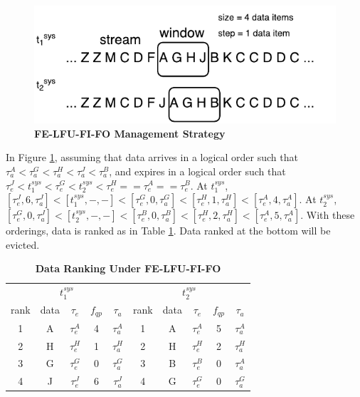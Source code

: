 \begin{figure}[!htbp]
	\centering
    \includegraphics[width=5in]{img/3-sifelfufifo.pdf}
    \caption{\textbf{FE-LFU-FI-FO Management Strategy}}
    \label{fig:3-sifelfufifo}
\end{figure}

In Figure \ref{fig:3-sifelfufifo}, assuming that data arrives in a logical order such that $\tau^{A}_{a} < \tau^{G}_{a} < \tau^{H}_{a} < \tau^{J}_{a} < \tau^{B}_{a}$, and expires in a logical order such that  $\tau^{J}_{e} < t^{sys}_{1} < \tau^{G}_{e} < t^{sys}_{2} < \tau^{H}_{e} == \tau^{A}_{e} == \tau^{B}_{e}$.
At $t^{sys}_{1}$, $[\tau^{J}_{e}, 6, \tau^{J}_{a}] < [t^{sys}_{1}, -, -] < [\tau^{G}_{e}, 0, \tau^{G}_{a}] < [\tau^{H}_{e}, 1, \tau^{H}_{a}] < [\tau^{A}_{e}, 4, \tau^{A}_{a}]$. 
At $t^{sys}_{2}$, $[\tau^{G}_{e}, 0, \tau^{J}_{a}] < [t^{sys}_{2}, -, -] < [\tau^{B}_{e}, 0, \tau^{B}_{a}] < [\tau^{H}_{e}, 2, \tau^{H}_{a}] < [\tau^{A}_{e}, 5, \tau^{A}_{a}]$. 
With these orderings, data is ranked as in Table \ref{tab:felfufifo}. 
Data ranked at the bottom will be evicted. 

\begin{table}[!htbp]
\centering
\caption{\textbf{Data Ranking Under FE-LFU-FI-FO}}
\label{tab:felfufifo}
\begin{tabular}{|c|c|c|c|c||c|c|c|c|c|}
\hline
\multicolumn{5}{|c||}{$t^{sys}_{1}$} & \multicolumn{5}{c|}{$t^{sys}_{2}$} \\ \hhline{|=====#=====|}
rank & data & $\tau_{e}$ & $f_{qp}$ & $\tau_{a}$ & rank & data & $\tau_{e}$ & $f_{qp}$ & $\tau_{a}$ \\ \hhline{|=|=|=|=|=#=|=|=|=|=|}
1 & A & $\tau^{A}_{e}$ & 4 & $\tau^{A}_{a}$ & 1 & A & $\tau^{A}_{e}$ & 5 & $\tau^{A}_{a}$ \\ \hline
2 & H & $\tau^{H}_{e}$ & 1 & $\tau^{H}_{a}$ & 2 & H & $\tau^{H}_{e}$ & 2 & $\tau^{H}_{a}$ \\ \hline
3 & G & $\tau^{G}_{e}$ & 0 & $\tau^{G}_{a}$ & 3 & B & $\tau^{B}_{e}$ & 0 & $\tau^{A}_{a}$ \\ \hline
4 & J & $\tau^{J}_{e}$ & 6 & $\tau^{J}_{a}$ & 4 & G & $\tau^{G}_{e}$ & 0 & $\tau^{G}_{a}$ \\ \hline
\end{tabular}
\end{table}


